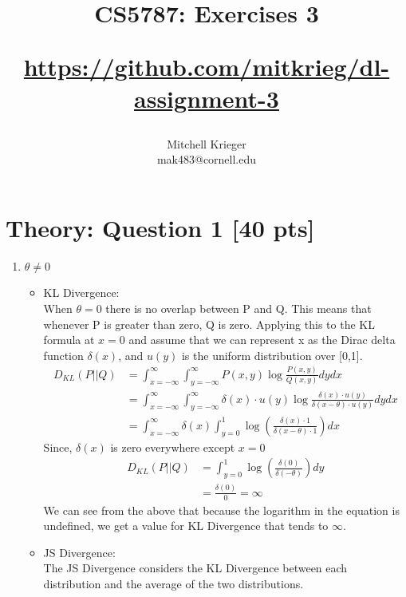 \documentclass{article}
\title{CS5787: Exercises 3 \\ \begin{small}\url{https://github.com/mitkrieg/dl-assignment-3}\end{small}}
\author{Mitchell Krieger \\ mak483@cornell.edu}
\date{}
\begin{document}
\maketitle

\section{Theory: Question 1 [40 pts]}

\begin{enumerate}[label=\alph*)]
    \item $\theta \neq 0$
        \begin{itemize}
            \item KL Divergence: \\ When $\theta = 0$ there is no overlap between P and Q. This means that whenever P is greater than zero, Q is zero. Applying this to the 
            KL formula at $x=0$ and assume that we can represent x as the Dirac delta function $\delta(x)$, and $u(y)$ is the uniform distribution over [0,1].
            \begin{equation}
                \begin{aligned}
                    D_{KL}(P||Q) &= \int_{x=-\infty}^{\infty} \int_{y=-\infty}^{\infty} P(x,y)\log \frac{P(x,y)}{Q(x,y)}dydx
                    \\ &= \int_{x=-\infty}^{\infty} \int_{y=-\infty}^{\infty} \delta(x)\cdot u(y)\log \frac{\delta(x)\cdot u(y)}{\delta(x-\theta)\cdot u(y)}dydx
                    \\ &= \int_{x=-\infty}^{\infty} \delta(x)  \int_{y=0}^{1} \log(\frac{\delta(x)\cdot 1}{\delta(x-\theta)\cdot 1}) dx
                \end{aligned}
            \end{equation}
            Since, $\delta(x)$ is zero everywhere except $x=0$
            \begin{equation}
                \begin{aligned}
                    D_{KL}(P||Q) &= \int_{y=0}^{1} \log(\frac{\delta(0)}{\delta(-\theta)}) dy
                    \\ &=  \frac{\delta(0)}{0} = \infty
                \end{aligned}
            \end{equation}
            We can see from the above that because the logarithm in the equation is undefined, we get a value for KL Divergence that tends to $\infty$.\\
            \item JS Divergence: \\ The JS Divergence considers the KL Divergence between each distribution and the average of the two distributions.

\end{itemize}
\end{enumerate}
\end{document}
